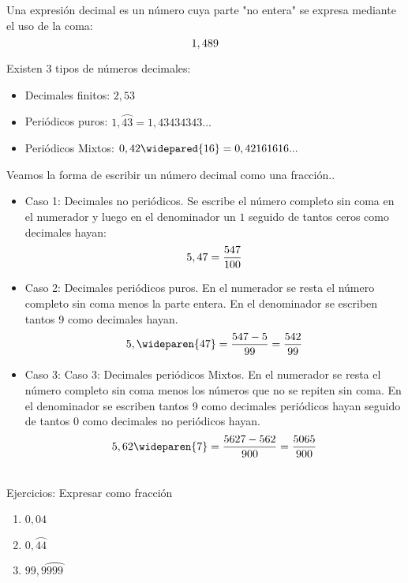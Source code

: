 Una expresión decimal es un número cuya parte "no entera" se expresa mediante el uso de la coma:\\
\begin{equation}
    \notag
    1,489
\end{equation}

Existen 3 tipos de números decimales:

\begin{itemize}
    \item Decimales finitos: $ 2,53$
    \item Periódicos puros:  $1,\wideparen{43}=1,43434343...$
    \item Periódicos Mixtos: $ 0,42\widepared{16}=0,42161616...$ 
    
\end{itemize}

Veamos la forma de escribir un número decimal como una fracción.. \\
\medskip

\begin{itemize}
    \item Caso 1: Decimales no periódicos. Se escribe el número completo sin coma en el numerador y luego en el denominador un $1$ seguido de tantos ceros como decimales hayan:
     \begin{equation}
    \notag
      5,47 = \frac{547}{100}
     \end{equation}
      
      
    \item Caso 2: Decimales periódicos puros. En el numerador se resta el número completo sin coma menos la parte entera. En el denominador se escriben tantos 9 como decimales hayan.
     \begin{equation}
    \notag
    5,\wideparen{47} = \frac{547-5}{99}=\frac{542}{99}
     \end{equation}
     
     
    \item Caso 3: Caso 3: Decimales periódicos Mixtos. En el numerador se resta el número completo sin coma menos los números que no se repiten sin coma. En el denominador se escriben tantos 9 como decimales periódicos hayan seguido de tantos 0 como decimales no periódicos hayan.
    \begin{equation}
    \notag
    5,62\wideparen{7} = \frac{5627-562}{900} = \frac{5065}{900}
     \end{equation}
\end{itemize}\\

Ejercicios: Expresar como fracción\\

\begin{enumerate}
\renewcommand{\labelenumi}{{\theenumi})}
\item $0,04$
\item $0,\wideparen{44}$
\item $99,9\wideparen{999}$
\end{enumerate}
